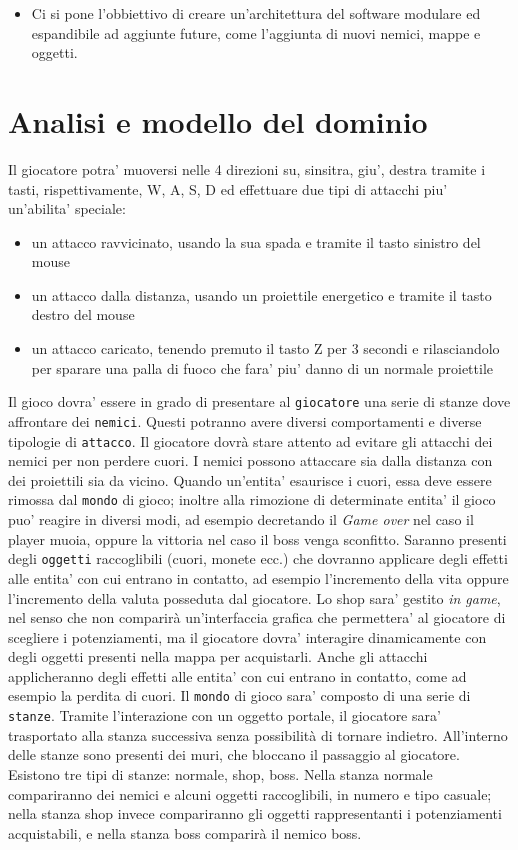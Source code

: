 \documentclass[a4paper,12pt]{report}
\begin{document}
\begin{itemize}
	\item Ci si pone l'obbiettivo di creare un'architettura del software modulare ed espandibile ad aggiunte future, come l'aggiunta di nuovi nemici, mappe e oggetti.
\end{itemize}


\section{Analisi e modello del dominio}
Il giocatore potra' muoversi nelle 4 direzioni su, sinsitra, giu', destra tramite i tasti, rispettivamente, W, A, S, D ed effettuare due tipi di attacchi piu' un'abilita' speciale:
\begin{itemize}
	\item un attacco ravvicinato, usando la sua spada e tramite il tasto sinistro del mouse
	\item un attacco dalla distanza, usando un proiettile energetico e tramite il tasto destro del mouse
	\item un attacco caricato, tenendo premuto il tasto Z per 3 secondi e rilasciandolo per sparare una palla di fuoco che fara' piu' danno di un normale proiettile
\end{itemize}
Il gioco dovra' essere in grado di presentare al \texttt{giocatore} una serie di stanze dove affrontare dei \texttt{nemici}. Questi potranno avere diversi comportamenti e diverse tipologie di \texttt{attacco}. Il giocatore dovrà stare attento ad evitare gli attacchi dei nemici per non perdere cuori. I nemici possono attaccare sia dalla distanza con dei proiettili sia da vicino. Quando un'entita' esaurisce i cuori, essa deve essere rimossa dal \texttt{mondo} di gioco; inoltre alla rimozione di determinate entita' il gioco puo' reagire in diversi modi, ad esempio decretando il \textit{Game over} nel caso il player muoia, oppure la vittoria nel caso il boss venga sconfitto.
Saranno presenti degli \texttt{oggetti} raccoglibili (cuori, monete ecc.) che dovranno applicare degli effetti alle entita' con cui entrano in contatto, ad esempio l'incremento della vita oppure l'incremento della valuta posseduta dal giocatore. 
Lo shop sara' gestito \textit{in game}, nel senso che non comparirà un'interfaccia grafica che permettera' al giocatore di scegliere i potenziamenti, ma il giocatore dovra' interagire dinamicamente con degli oggetti presenti nella mappa per acquistarli.
Anche gli attacchi applicheranno degli effetti alle entita' con cui entrano in contatto, come ad esempio la perdita di cuori.
Il \texttt{mondo} di gioco  sara' composto di una serie di \texttt{stanze}. Tramite l'interazione con un oggetto portale, il giocatore sara' trasportato alla stanza successiva senza possibilità di tornare indietro. All'interno delle stanze sono presenti dei muri, che bloccano il passaggio al giocatore. Esistono tre tipi di stanze: normale, shop, boss. Nella stanza normale compariranno dei nemici e alcuni oggetti raccoglibili, in numero e tipo casuale; nella stanza shop invece compariranno gli oggetti rappresentanti i potenziamenti acquistabili, e nella stanza boss comparirà il nemico boss.
\end{document}
